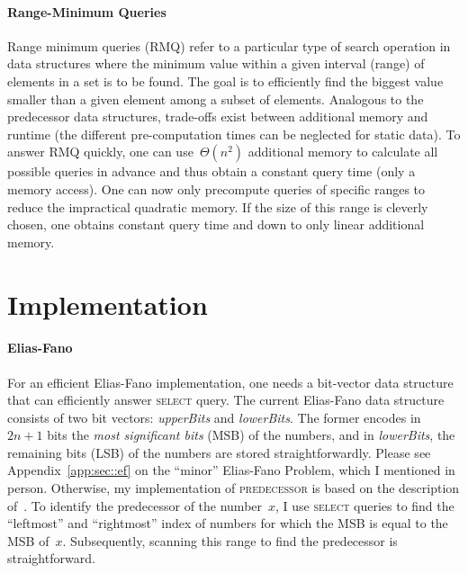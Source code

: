 \documentclass[a4paper,UKenglish,cleveref, autoref, thm-restate]{lipics-v2021}
\begin{document}
	\paragraph*{Range-Minimum Queries}
	Range minimum queries (RMQ) refer to a particular type of search operation in data structures where the minimum value within a given interval (range) of elements in a set is to be found. The goal is to efficiently find the biggest value smaller than a given element among a subset of elements. Analogous to the predecessor data structures, trade-offs exist between additional memory and runtime (the different pre-computation times can be neglected for static data). To answer RMQ quickly, one can use~$\Theta\left(n^2\right)$ additional memory to calculate all possible queries in advance and thus obtain a constant query time (only a memory access). One can now only precompute queries of specific ranges to reduce the impractical quadratic memory. If the size of this range is cleverly chosen, one obtains constant query time and down to only linear additional memory.
	
	\section{Implementation}
	
	\paragraph*{Elias-Fano}
	For an efficient Elias-Fano implementation, one needs a bit-vector data structure that can efficiently answer \textsc{select} query. The current Elias-Fano data structure consists of two bit vectors: \textit{upperBits} and \textit{lowerBits}. The former encodes in~$2n+1$ bits the \textit{most significant bits} (MSB) of the numbers, and in \textit{lowerBits}, the remaining bits (LSB) of the numbers are stored straightforwardly. Please see Appendix~\ref{app:sec::ef} on the ``minor'' Elias-Fano Problem, which I mentioned in person. Otherwise, my implementation of \textsc{predecessor} is based on the description of~\cite{pibiri2020succinct}. To identify the predecessor of the number~$x$, I use \textsc{select} queries to find the ``leftmost'' and ``rightmost'' index of numbers for which the MSB is equal to the MSB of~$x$. Subsequently, scanning this range to find the predecessor is straightforward.
\end{document}
